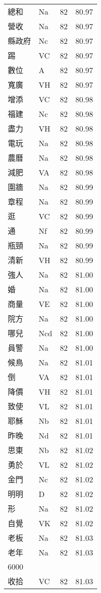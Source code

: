 \documentclass[twocolumn]{book}
\begin{document}
\begin{supertabular}{llrr}
總和 & Na & 82 &  80.97\\
營收 & Na & 82 &  80.97\\
縣政府 & Nc & 82 &  80.97\\
踢 & VC & 82 &  80.97\\
數位 & A & 82 &  80.97\\
寬廣 & VH & 82 &  80.97\\
增添 & VC & 82 &  80.98\\
福建 & Nc & 82 &  80.98\\
盡力 & VH & 82 &  80.98\\
電玩 & Na & 82 &  80.98\\
農曆 & Na & 82 &  80.98\\
減肥 & VA & 82 &  80.98\\
圍牆 & Na & 82 &  80.99\\
章程 & Na & 82 &  80.99\\
逛 & VC & 82 &  80.99\\
通 & Nf & 82 &  80.99\\
瓶頸 & Na & 82 &  80.99\\
清新 & VH & 82 &  80.99\\
強人 & Na & 82 &  81.00\\
婚 & Na & 82 &  81.00\\
商量 & VE & 82 &  81.00\\
院方 & Na & 82 &  81.00\\
哪兒 & Ncd & 82 &  81.00\\
員警 & Na & 82 &  81.00\\
候鳥 & Na & 82 &  81.01\\
倒 & VA & 82 &  81.01\\
降價 & VH & 82 &  81.01\\
致使 & VL & 82 &  81.01\\
耶穌 & Nb & 82 &  81.01\\
昨晚 & Nd & 82 &  81.01\\
思東 & Nb & 82 &  81.02\\
勇於 & VL & 82 &  81.02\\
金門 & Nc & 82 &  81.02\\
明明 & D & 82 &  81.02\\
形 & Na & 82 &  81.02\\
自覺 & VK & 82 &  81.02\\
老板 & Na & 82 &  81.03\\
老年 & Na & 82 &  81.03\\
6000\\
收拾 & VC & 82 &  81.03\\

\end{supertabular}
\end{document}
